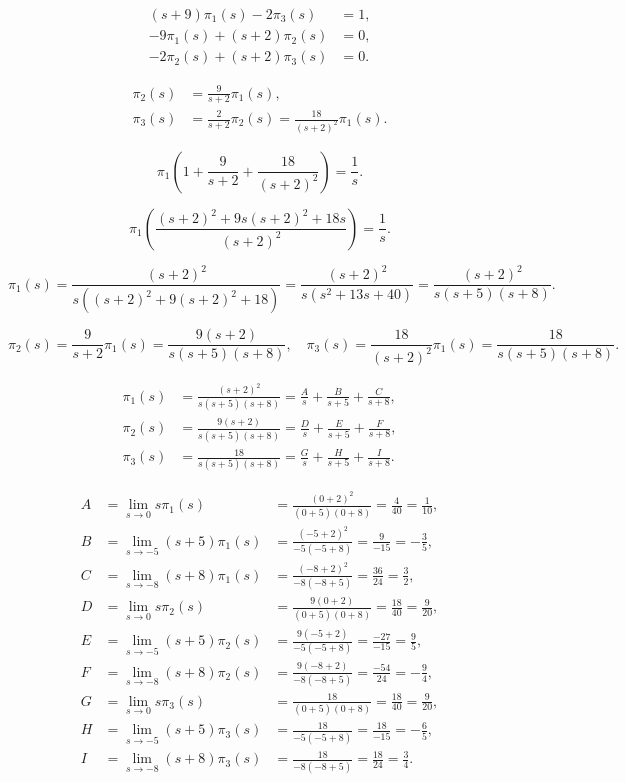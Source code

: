 \[
	\begin{aligned}
		(s+9)\pi_1(s)-2\pi_3(s)  & = 1, \\
		-9\pi_1(s)+(s+2)\pi_2(s) & = 0, \\
		-2\pi_2(s)+(s+2)\pi_3(s) & = 0.
	\end{aligned}
\]

\[
	\begin{aligned}
		\pi_2(s) & = \frac{9}{s+2}\pi_1(s),                              \\
		\pi_3(s) & = \frac{2}{s+2}\pi_2(s) = \frac{18}{(s+2)^2}\pi_1(s).
	\end{aligned}
\]

\[
	\pi_1(1+ \frac{9}{s+2} + \frac{18}{(s+2)^2}) = \frac{1}{s}.
\]

\[
	\pi_1\left(\frac{(s+2)^2+9s(s+2)^2+ 18s}{(s+2)^2}\right) = \frac{1}{s}.
\]

\[
	\pi_1(s) = \frac{(s+2)^2}{s((s+2)^2+9(s+2)^2+ 18)}
	= \frac{(s+2)^2}{s(s^2+13s+40)}
	= \frac{(s+2)^2}{s(s+5)(s+8)}.
\]

\[
	\pi_2(s) = \frac{9}{s+2}\pi_1(s) = \frac{9(s+2)}{s(s+5)(s+8)},
	\quad
	\pi_3(s) = \frac{18}{(s+2)^2}\pi_1(s) = \frac{18}{s(s+5)(s+8)}.
\]

\[
	\begin{aligned}
		\pi_1(s) & = \frac{(s+2)^2}{s(s+5)(s+8)} = \frac{A}{s} + \frac{B}{s+5} + \frac{C}{s+8}, \\
		\pi_2(s) & = \frac{9(s+2)}{s(s+5)(s+8)} = \frac{D}{s} + \frac{E}{s+5} + \frac{F}{s+8},  \\
		\pi_3(s) & = \frac{18}{s(s+5)(s+8)} = \frac{G}{s} + \frac{H}{s+5} + \frac{I}{s+8}.
	\end{aligned}
\]

\[
	\begin{aligned}
		A & = \lim_{s\rightarrow 0} s\pi_1(s)      & = \frac{(0+2)^2}{(0+5)(0+8)} = \frac{4}{40} = \frac{1}{10}, \\
		B & = \lim_{s\rightarrow -5} (s+5)\pi_1(s) & = \frac{(-5+2)^2}{-5(-5+8)} = \frac{9}{-15} = -\frac{3}{5}, \\
		C & = \lim_{s\rightarrow -8} (s+8)\pi_1(s) & = \frac{(-8+2)^2}{-8(-8+5)} = \frac{36}{24} = \frac{3}{2},  \\
		D & = \lim_{s\rightarrow 0} s\pi_2(s)      & = \frac{9(0+2)}{(0+5)(0+8)} = \frac{18}{40} = \frac{9}{20}, \\
		E & = \lim_{s\rightarrow -5} (s+5)\pi_2(s) & = \frac{9(-5+2)}{-5(-5+8)} = \frac{-27}{-15} = \frac{9}{5}, \\
		F & = \lim_{s\rightarrow -8} (s+8)\pi_2(s) & = \frac{9(-8+2)}{-8(-8+5)} = \frac{-54}{24} = -\frac{9}{4}, \\
		G & = \lim_{s\rightarrow 0} s\pi_3(s)      & = \frac{18}{(0+5)(0+8)} = \frac{18}{40} = \frac{9}{20},     \\
		H & = \lim_{s\rightarrow -5} (s+5)\pi_3(s) & = \frac{18}{-5(-5+8)} = \frac{18}{-15} = -\frac{6}{5},      \\
		I & = \lim_{s\rightarrow -8} (s+8)\pi_3(s) & = \frac{18}{-8(-8+5)} = \frac{18}{24} = \frac{3}{4}.
	\end{aligned}
\]

